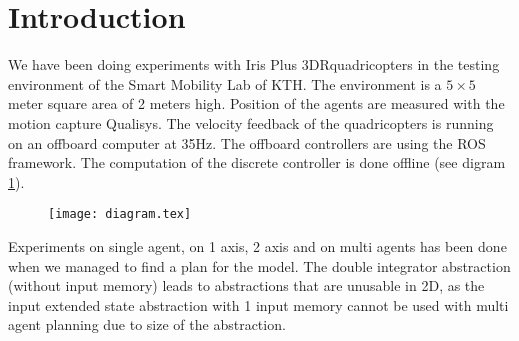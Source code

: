 \section{Introduction}
We have been doing experiments with Iris Plus 3DR\trademark quadricopters in the testing environment of the Smart Mobility Lab of KTH.
The environment is a $5\times5$ meter square area of 2 meters high.
Position of the agents are measured with the motion capture Qualisys\trademark.
The velocity feedback of the quadricopters is running on an offboard computer at 35Hz. The offboard controllers are using the ROS framework.
The computation of the discrete controller is done offline (see digram \ref{diagram}).

\begin{figure}
\texttt{[image: diagram.tex]}
\label{diagram}
\end{figure}

Experiments on single agent, on 1 axis, 2 axis and on multi agents has been done when we managed to find a plan for the model.
The double integrator abstraction (without input memory) leads to abstractions that are unusable in 2D, as the input extended state abstraction with 1 input memory cannot be used with multi agent planning due to size of the abstraction.
